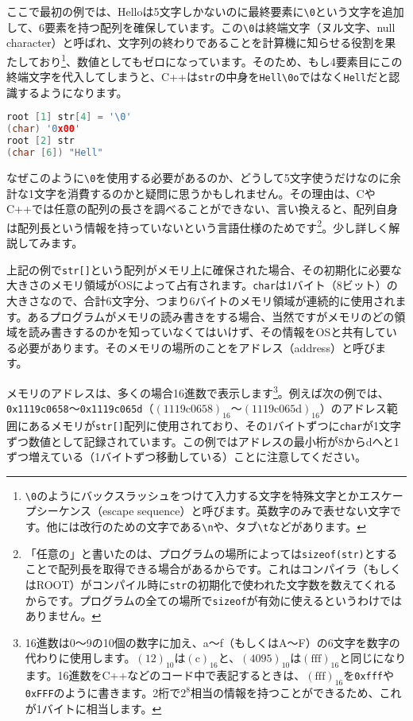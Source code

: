 ここで最初の例では、Helloは5文字しかないのに最終要素に\texttt{\textbackslash{}0}という文字を追加して、6要素を持つ配列を確保しています。この\texttt{\textbackslash{}0}は終端文字（ヌル文字、null character）と呼ばれ、文字列の終わりであることを計算機に知らせる役割を果たしており\footnote{\texttt{\textbackslash{}0}のようにバックスラッシュをつけて入力する文字を特殊文字とかエスケープシーケンス（escape sequence）と呼びます。英数字のみで表せない文字です。他には改行のための文字である\texttt{\textbackslash{}n}や、タブ\texttt{\textbackslash{}t}などがあります。}、数値としてもゼロになっています。そのため、もし4要素目にこの終端文字を代入してしまうと、C++は\texttt{str}の中身を\texttt{Hell\textbackslash{}0o}ではなく\texttt{Hell}だと認識するようになります。
\begin{lstlisting}[language=c++]
root [1] str[4] = '\0'
(char) '0x00'
root [2] str
(char [6]) "Hell"
\end{lstlisting}

なぜこのように\texttt{\textbackslash{}0}を使用する必要があるのか、どうして5文字使うだけなのに余計な1文字を消費するのかと疑問に思うかもしれません。その理由は、CやC++では任意の配列の長さを調べることができない、言い換えると、配列自身は配列長という情報を持っていないという言語仕様のためです\footnote{「任意の」と書いたのは、プログラムの場所によっては\texttt{sizeof(str)}とすることで配列長を取得できる場合があるからです。これはコンパイラ（もしくはROOT）がコンパイル時に\texttt{str}の初期化で使われた文字数を数えてくれるからです。プログラムの全ての場所で\texttt{sizeof}が有効に使えるというわけではありません。}。少し詳しく解説してみます。

上記の例で\texttt{str[]}という配列がメモリ上に確保された場合、その初期化に必要な大きさのメモリ領域がOSによって占有されます。\texttt{char}は1バイト（8ビット）の大きさなので、合計6文字分、つまり6バイトのメモリ領域が連続的に使用されます。あるプログラムがメモリの読み書きをする場合、当然ですがメモリのどの領域を読み書きするのかを知っていなくてはいけず、その情報をOSと共有している必要があります。そのメモリの場所のことをアドレス（address）と呼びます。

メモリのアドレスは、多くの場合16進数で表示します\footnote{16進数は0〜9の10個の数字に加え、a〜f（もしくはA〜F）の6文字を数字の代わりに使用します。$(12)_{10}$は$(\mathrm{c})_{16}$と、$(4095)_{10}$は$(\mathrm{fff})_{16}$と同じになります。16進数をC++などのコード中で表記するときは、$(\mathrm{fff})_{16}$を\texttt{0xfff}や\texttt{0xFFF}のように書きます。2桁で$2^{8}$相当の情報を持つことができるため、これが1バイトに相当します。}。例えば次の例では、\texttt{0x1119c0658}〜\texttt{0x1119c065d}（$(1119\mathrm{c}0658)_{16}$〜$(\mathrm{1119c065d})_{16}$）のアドレス範囲にあるメモリが\texttt{str[]}配列に使用されており、その1バイトずつに\texttt{char}が1文字ずつ数値として記録されています。この例ではアドレスの最小桁が8からdへと1ずつ増えている（1バイトずつ移動している）ことに注意してください。

